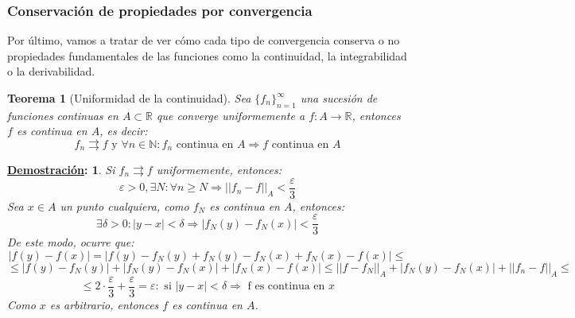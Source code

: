 \documentclass[10pt,a4paper,openright]{book}
\theoremstyle{break}
\newtheorem*{theo}{Teorema}
\newtheorem*{demo}{\underline{Demostración}:}
\begin{document}
\subsubsection{Conservación de propiedades por convergencia}
Por último, vamos a tratar de ver cómo cada tipo de convergencia conserva o no propiedades fundamentales de las funciones como la continuidad, la integrabilidad o la derivabilidad.

\begin{theo}[Uniformidad de la continuidad]
Sea $\{f_n\}_{n=1}^\infty$ una sucesión de funciones continuas en $A \subset \mathbb{R}$ que converge uniformemente a $f: A \to \mathbb{R}$, entonces $f$ es continua en $A$, es decir:
$$f_n\rightrightarrows f \mbox{ y } \forall n \in \mathbb{N} : f_n \mbox{ continua  en } A \Rightarrow f \mbox{ continua en }A$$
\end{theo}
\begin{demo}
Si $f_n \rightrightarrows f$ uniformemente, entonces:
$$\varepsilon > 0, \exists N: \forall n \geq N \Rightarrow ||f_n - f ||_A < \frac{\varepsilon}{3}$$
Sea $x \in A$ un punto cualquiera, como $f_N$ es continua en  $A$, entonces:
$$\exists \delta > 0 : |y-x|<\delta \Rightarrow |f_N (y) - f_N (x)| < \frac{\varepsilon}{3}$$
De este modo, ocurre que:
$$|f (y) - f (x)| = |f (y) - f_N (y) + f_N (y) -f_N (x) + f_N (x) - f(x)| \leq $$
$$\leq |f(y) - f_N (y)| + |f_N (y) - f_N (x)| + |f_N (x) - f(x)| \leq || f - f_N ||_A + |f_N (y) - f_N (x)| + ||f_n - f||_A \leq$$
$$\leq 2 \cdot \frac{\varepsilon}{3} + \frac{\varepsilon}{3}  = \varepsilon : \mbox{ si } |y-x| < \delta \Rightarrow \mbox{ f es continua en } x$$
Como $x$ es arbitrario, entonces $f$ es continua en $A$.
\end{demo}
\end{document}
